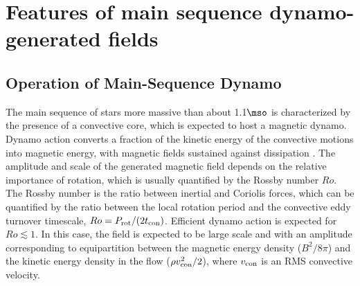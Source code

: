 \section{Features of main sequence dynamo-generated fields}
\label{dynamo}

\subsection{Operation of Main-Sequence Dynamo}\label{msdynamo}

The main sequence of stars more massive than about 1.1$\mso$ is characterized by the presence of a convective core,
which is expected to host a magnetic dynamo. Dynamo action converts a fraction of the kinetic energy 
of the convective motions into magnetic energy, with magnetic fields sustained against dissipation  \citep[see e.g.,][]{Brandenburg_2005}. The amplitude and scale of the generated magnetic field depends on the relative importance of rotation, which is usually quantified by the Rossby number $Ro$. The Rossby number is the ratio between inertial and Coriolis forces, which can be quantified by the ratio between the local rotation period and the convective eddy turnover timescale, $Ro = P_{\rm rot}/(2 t_{\rm con})$. 
Efficient dynamo action is expected for $Ro \lesssim 1$. In this case, the field is expected to be large scale and with an amplitude corresponding to equipartition between the magnetic energy density ($B^2/8\pi$) and the kinetic energy density in the flow ($\rho v^2_{\rm con}/2$), where $v_{\rm con}$ is an RMS convective velocity.

